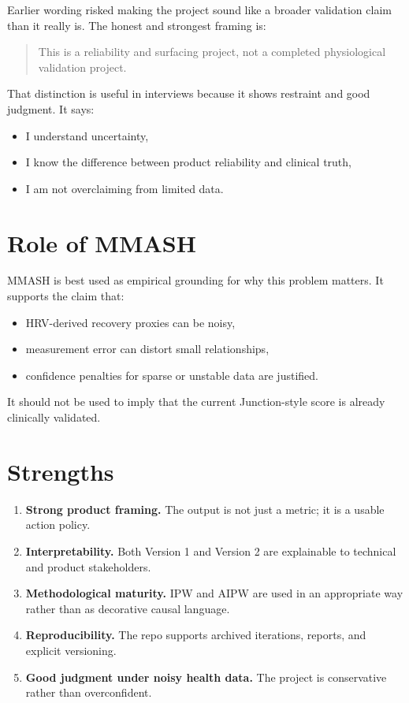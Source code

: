 \documentclass[11pt]{article}
\begin{document}
Earlier wording risked making the project sound like a broader validation claim than it really is. The honest and strongest framing is:
\begin{quote}
This is a reliability and surfacing project, not a completed physiological validation project.
\end{quote}

That distinction is useful in interviews because it shows restraint and good judgment. It says:
\begin{itemize}[leftmargin=1.5em]
    \item I understand uncertainty,
    \item I know the difference between product reliability and clinical truth,
    \item I am not overclaiming from limited data.
\end{itemize}

\section{Role of MMASH}

MMASH is best used as empirical grounding for why this problem matters. It supports the claim that:
\begin{itemize}[leftmargin=1.5em]
    \item HRV-derived recovery proxies can be noisy,
    \item measurement error can distort small relationships,
    \item confidence penalties for sparse or unstable data are justified.
\end{itemize}

It should not be used to imply that the current Junction-style score is already clinically validated.

\section{Strengths}

\begin{enumerate}[leftmargin=1.5em]
    \item \textbf{Strong product framing.} The output is not just a metric; it is a usable action policy.
    \item \textbf{Interpretability.} Both Version 1 and Version 2 are explainable to technical and product stakeholders.
    \item \textbf{Methodological maturity.} IPW and AIPW are used in an appropriate way rather than as decorative causal language.
    \item \textbf{Reproducibility.} The repo supports archived iterations, reports, and explicit versioning.
    \item \textbf{Good judgment under noisy health data.} The project is conservative rather than overconfident.
\end{enumerate}
\end{document}
